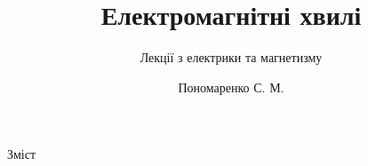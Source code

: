 \documentclass[onlytextwidth]{beamer}
\title[Лекції електрики та магнетизму]{\huge\bfseries Електромагнітні хвилі}
\subtitle{Лекції з електрики та магнетизму}
\author{Пономаренко С. М.}
\date{}
\begin{document}
\begin{frame}[plain]
	\maketitle
\end{frame}


\begin{frame}{Зміст}{}
	\tableofcontents
\end{frame}



%


%
%
\end{document}
